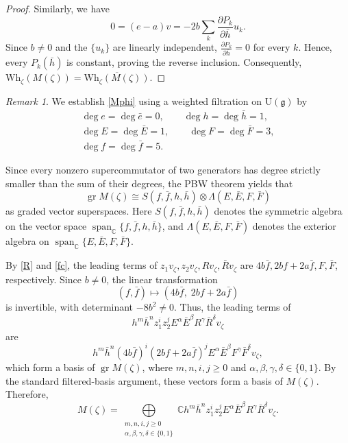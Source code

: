 \documentclass[a4paper,10pt]{article}
\theoremstyle{definition}
\theoremstyle{plain}
\theoremstyle{remark}
\newtheorem{remark}[definition]{Remark}
\theoremstyle{mystyle}
\numberwithin{equation}{section}
\begin{document}
\begin{proof}
    Similarly, we have 
    $$
    0=( e-a)v=-2b\sum_{k}\frac{\partial P_k}{\partial \bar h}u_k.
    $$
    Since $b\neq 0$ and the $\{u_{k}\}$ are linearly independent, $\frac{\partial P_k}{\partial \bar h}=0$ for every $k$. Hence, every $P_k(\bar h)$ is constant, proving the reverse inclusion. Consequently, $\mathrm{Wh}_{\zeta}(M(\zeta))=\overline{\mathrm{Wh}_{\zeta}(M(\zeta))}$.
\end{proof}
\begin{remark}\label{rem:PBWcom}
    We establish \eqref{Mphi} using a weighted filtration on \(\mathrm U(\mathfrak g)\) by
    \[
    \begin{gathered}
    \deg e=\deg\bar e=0,\qquad
    \deg h=\deg\bar h=1,\\
    \deg E=\deg\bar E=1,\qquad
    \deg F=\deg\bar F=3,\\
    \deg f=\deg\bar f=5.
    \end{gathered}
    \]

    Since every nonzero supercommutator of two generators has degree strictly smaller than the sum of their degrees, the PBW theorem yields that
    \[
    \operatorname{gr}M(\zeta)\cong S(f,\bar f,h,\bar h)\otimes\Lambda(E,\bar E,F,\bar F)
    \]
    as graded vector superspaces. Here \(S(f,\bar f,h,\bar h)\) denotes the symmetric algebra on the vector space \(\operatorname{span}_{\mathbb C}\{f,\bar f,h,\bar h\}\), and \(\Lambda(E,\bar E,F,\bar F)\) denotes the exterior algebra on \(\operatorname{span}_{\mathbb C}\{E,\bar E,F,\bar F\}\).

    By \eqref{R} and \eqref{fc}, the leading terms of $z_1v_{\zeta},z_2v_{\zeta},Rv_{\zeta},\bar Rv_{\zeta}$ are $4b\bar f,2bf+2a\bar f,F,\bar F$, respectively.
    Since \(b\neq0\), the linear transformation
    \[
    (f,\bar f)\mapsto(4b\bar f,\;2bf+2a\bar f)
    \]
    is invertible, with determinant \(-8b^2\neq0\). Thus, the leading terms of 
    \[
        h^m\bar h^n z_1^iz_2^jE^\alpha\bar E^\beta R^\gamma\bar R^\delta v_\zeta
    \]
    are
    \[
        h^m\bar h^n(4b\bar f)^i(2bf+2a\bar f)^jE^\alpha\bar E^\beta F^\gamma\bar F^\delta v_{\zeta},
    \]
    which form a basis of \(\operatorname{gr}M(\zeta)\), where $m,n,i,j\geq 0$ and $\alpha,\beta,\gamma,\delta\in \{0,1\}$. By the standard filtered-basis argument, these vectors form a basis of \(M(\zeta)\). Therefore,
\[
M(\zeta)=
\bigoplus\limits_{\substack{m,n,i,j\geq0\\
\alpha,\beta,\gamma,\delta\in\{0,1\}}}
\mathbb C h^m\bar h^n z_1^iz_2^j
E^\alpha\bar E^\beta
R^\gamma\bar R^\delta v_\zeta.
\]
\end{remark}
\end{document}
